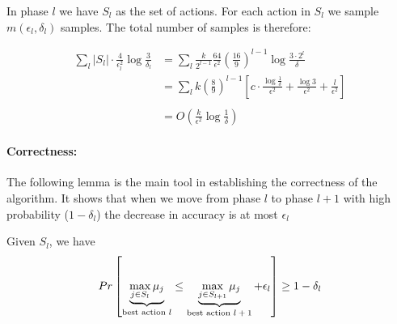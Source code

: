 In phase $l$ we have $S_l$ as the set of actions. For each action in $S_l$ we sample $m(\epsilon_l,\delta_l)$ samples.
The total number of samples is therefore:

\begin{align*}
 \sum_l |S_l| \cdot \frac{4}{\epsilon_l^2}\log \frac{3}{\delta_l} &=
\sum_{l}\frac{k}{2^{l-1}}\frac{64}{\epsilon^{2}}\left(\frac{16}{9}\right)^{l-1}\log\frac{3\cdot2^{l}}{\delta}\\
& =  {\displaystyle \sum_{l}k\left(\frac{8}{9}\right)^{l-1}\left[c\cdot\frac{\log\frac{1}{\delta}}{\epsilon^{2}}+\frac{\log3}{\epsilon^{2}}+\frac{l}{\epsilon^{2}}\right]}\\
\\
 & =  O\left(\frac{k}{\epsilon^{2}}\log\frac{1}{\delta}\right)
\end{align*}


\paragraph{Correctness:}
The following lemma is the main tool in establishing the correctness of the algorithm. It shows that when we move from phase $l$ to phase $l+1$ with high probability ($1-\delta_l$) the decrease in accuracy is at most $\epsilon_l$

\begin{lemma}
Given $S_l$, we have
$$Pr\left[\underbrace{{\displaystyle \max_{j\in
S_{l}}\mu_{j}}}_{\text{best action
\ensuremath{l}}}\le\underbrace{{\displaystyle \max_{j\in
S_{l+1}}\mu_{j}}}_{\text{best action
\ensuremath{l+1}}}+\epsilon_{l}\right]\ge1-\delta_{l}$$
\end{lemma}

